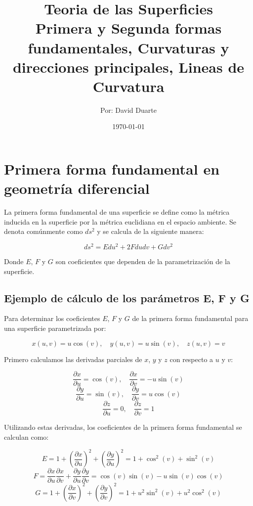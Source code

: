 \documentclass{article}
\title{Teoria de las Superficies  \\ \large Primera y Segunda formas fundamentales,  Curvaturas y direcciones principales, Lineas de Curvatura}
\author{Por: David Duarte}
\date{\today}
\begin{document}
	

	
	\maketitle
	
	\section{Primera forma fundamental en geometría diferencial}
	
	La primera forma fundamental de una superficie se define como la métrica inducida en la superficie por la métrica euclidiana en el espacio ambiente. Se denota comúnmente como $ds^2$ y se calcula de la siguiente manera:
	
	$$ ds^2 = E du^2 + 2F du dv + G dv^2 $$
	
	Donde $E$, $F$ y $G$ son coeficientes que dependen de la parametrización de la superficie.
	
	\subsection{Ejemplo de cálculo de los parámetros E, F y G}
	
	Para determinar los coeficientes $E$, $F$ y $G$ de la primera forma fundamental para una superficie parametrizada por:
	
	$$ x(u,v) = u \cos(v), \quad y(u,v) = u \sin(v), \quad z(u,v) = v $$
	
	Primero calculamos las derivadas parciales de $x$, $y$ y $z$ con respecto a $u$ y $v$:
	
	$$ \frac{\partial x}{\partial u} = \cos(v), \quad \frac{\partial x}{\partial v} = -u \sin(v) $$
	$$ \frac{\partial y}{\partial u} = \sin(v), \quad \frac{\partial y}{\partial v} = u \cos(v) $$
	$$ \frac{\partial z}{\partial u} = 0, \quad \frac{\partial z}{\partial v} = 1 $$
	
	Utilizando estas derivadas, los coeficientes de la primera forma fundamental se calculan como:
	
	$$ E = 1 + \left( \frac{\partial x}{\partial u} \right)^2 + \left( \frac{\partial y}{\partial u} \right)^2 = 1 + \cos^2(v) + \sin^2(v) $$
	$$ F = \frac{\partial x}{\partial u} \frac{\partial x}{\partial v} + \frac{\partial y}{\partial u} \frac{\partial y}{\partial v} = \cos(v) \sin(v) - u \sin(v) \cos(v) $$
	$$ G = 1 + \left( \frac{\partial x}{\partial v} \right)^2 + \left( \frac{\partial y}{\partial v} \right)^2 = 1 + u^2 \sin^2(v) + u^2 \cos^2(v) $$
	
\end{document}
